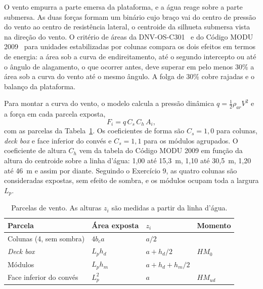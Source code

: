 \documentclass[11pt,a4paper]{article}
\begin{document}
O vento empurra a parte emersa da plataforma, e a água reage sobre a parte submersa. As duas
forças formam um binário cujo braço vai do centro de pressão do vento ao centro de resistência
lateral, o centroide da silhueta submersa vista na direção do vento. O critério de áreas da
DNV-OS-C301~\cite{c301} e do Código MODU 2009~\cite{modu} para unidades estabilizadas por colunas
compara os dois efeitos em termos de energia: a área sob a curva de endireitamento, até o segundo
intercepto ou até o ângulo de alagamento, o que ocorrer antes, deve superar em pelo menos 30\% a
área sob a curva do vento até o mesmo ângulo. A folga de 30\% cobre rajadas e o balanço da
plataforma.

Para montar a curva do vento, o modelo calcula a pressão dinâmica $q = \frac12 \rho_{ar} V^2$ e a
força em cada parcela exposta,
\begin{equation}
F_i = q\, C_s\, C_h\, A_i ,
\end{equation}
com as parcelas da Tabela~\ref{tab:parcelas}. Os coeficientes de forma são $C_s = 1{,}0$ para
colunas, \emph{deck box} e face inferior do convés e $C_s = 1{,}1$ para os módulos agrupados. O
coeficiente de altura $C_h$ vem da tabela do Código MODU 2009 em função da altura do centroide
sobre a linha d'água: 1,00 até 15,3~m, 1,10 até 30,5~m, 1,20 até 46~m e assim por diante. Seguindo
o Exercício 9, as quatro colunas são consideradas expostas, sem efeito de sombra, e os módulos
ocupam toda a largura $L_p$.

\begin{table}[!htb]
\centering
\caption[Parcelas de vento]{Parcelas de vento. As alturas $z_i$ são medidas a partir da linha
d'água.}\label{tab:parcelas}
\begin{tabular}{llll}
\toprule
Parcela & Área exposta & $z_i$ & Momento \\
\midrule
Colunas (4, sem sombra) & $4 b_c a$ & $a/2$ & \multirow{3}{*}{$HM_0$} \\
\emph{Deck box} & $L_p h_d$ & $a + h_d/2$ & \\
Módulos & $L_p h_m$ & $a + h_d + h_m/2$ & \\
Face inferior do convés & $L_p^2$ & $a$ & $HM_{ud}$ \\
\bottomrule
\end{tabular}
\end{table}
\end{document}
